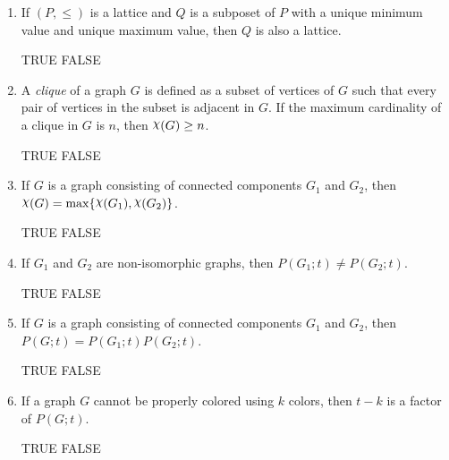 \documentclass[11pt]{article}
\theoremstyle{definition}
\newcommand{\ds}{\displaystyle}
\DeclareMathOperator{\Des}{Des}
\DeclareMathOperator{\maj}{maj}
\newcommand{\qbinom}[2]{
  \displaystyle \left[\begin{matrix}#1  \\#2  \\ \end{matrix}\right]}
\DeclareRobustCommand{\rchi}{{\mathpalette\irchi\relax}}
\newcommand{\irchi}[2]{\raisebox{\depth}{$#1\chi$}}
\begin{document}
\begin{enumerate}
\begin{enumerate}
%
%

%
%

\item If $(P,\leq)$ is a lattice and $Q$ is a subposet of $P$ with a unique minimum value and unique maximum value, then $Q$ is also a lattice.

\smallskip

TRUE \qquad FALSE

%
%

\item A \emph{clique} of a graph $G$ is defined as a subset of vertices of $G$ such that every pair of vertices in the subset is adjacent in $G$. If the maximum cardinality of a clique in $G$ is $n$, then $\rchi(G)\geq n$.

\smallskip

TRUE \qquad FALSE

\item If $G$ is a graph consisting of connected components $G_1$ and $G_2$, then $\rchi(G)=\max\{\rchi(G_1),\rchi(G_2)\}$.

\smallskip

TRUE \qquad FALSE

\item If $G_1$ and $G_2$ are non-isomorphic graphs, then $P(G_1;t)\neq P(G_2;t)$. 

\smallskip

TRUE \qquad FALSE


\item If $G$ is a graph consisting of connected components $G_1$ and $G_2$, then $P(G;t)=P(G_1;t)P(G_2;t)$.

\smallskip

TRUE \qquad FALSE

\item If a graph $G$ cannot be properly colored using $k$ colors, then $t-k$ is a factor of $P(G;t)$.

\smallskip

TRUE \qquad FALSE


\end{enumerate}
\end{enumerate}
\end{document}
